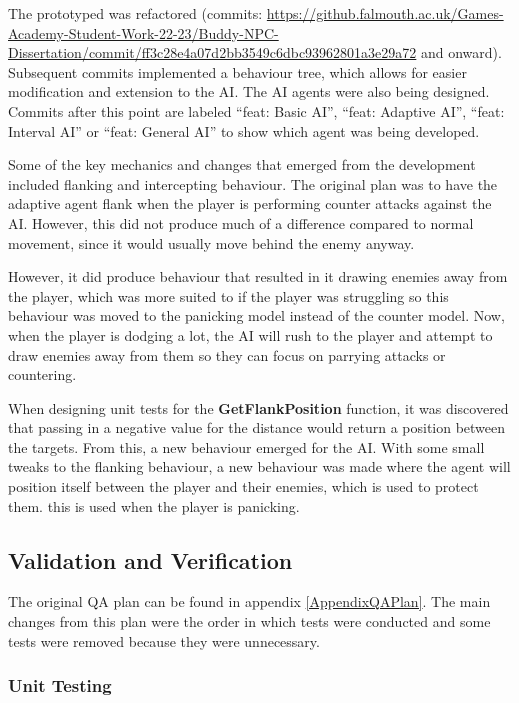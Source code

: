 \documentclass{IEEEtran}
\begin{document}
The prototyped was refactored (commits: \url{https://github.falmouth.ac.uk/Games-Academy-Student-Work-22-23/Buddy-NPC-Dissertation/commit/ff3c28e4a07d2bb3549c6dbc93962801a3e29a72} and onward). Subsequent commits implemented a behaviour tree, which allows for easier modification and extension to the AI. The AI agents were also being designed. Commits after this point are labeled “feat: Basic AI”, “feat: Adaptive AI”, “feat: Interval AI” or “feat: General AI” to show which agent was being developed.

Some of the key mechanics and changes that emerged from the development included flanking and intercepting behaviour. The original plan was to have the adaptive agent flank when the player is performing counter attacks against the AI. However, this did not produce much of a difference compared to normal movement, since it would usually move behind the enemy anyway.

However, it did produce behaviour that resulted in it drawing enemies away from the player, which was more suited to if the player was struggling so this behaviour was moved to the panicking model instead of the counter model. Now, when the player is dodging a lot, the AI will rush to the player and attempt to draw enemies away from them so they can focus on parrying attacks or countering.


When designing unit tests for the \textbf{GetFlankPosition} function, it was discovered that passing in a negative value for the distance would return a position between the targets. From this, a new behaviour emerged for the AI. With some small tweaks to the flanking behaviour, a new behaviour was made where the agent will position itself between the player and their enemies, which is used to protect them. this is used when the player is panicking.

\subsection{Validation and Verification}
\label{Validation}

The original QA plan can be found in appendix \ref{AppendixQAPlan}. The main changes from this plan were the order in which tests were conducted and some tests were removed because they were unnecessary.

\subsubsection{Unit Testing}
\end{document}
